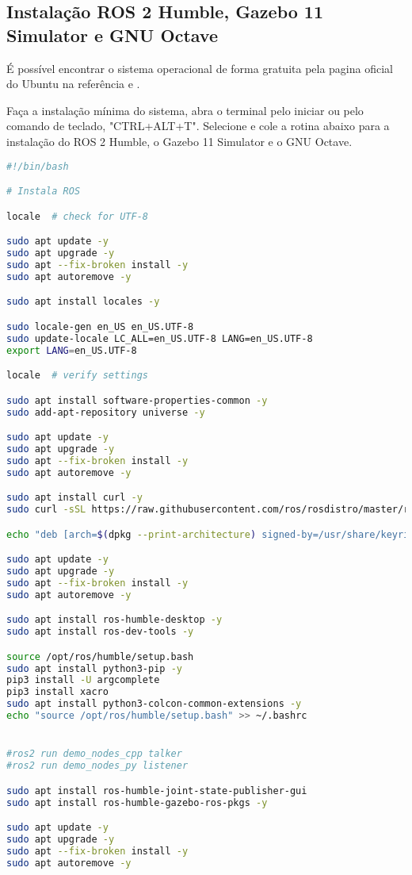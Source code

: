 \subsection{Instalação ROS 2 Humble, Gazebo 11 Simulator e GNU Octave}

É possível encontrar o sistema operacional de forma gratuita pela pagina oficial do Ubuntu na referência \cite{ubuntuweb} e \cite{gazebosim}.

Faça a instalação mínima do sistema, abra o terminal pelo iniciar ou pelo comando de teclado, "CTRL+ALT+T". Selecione e cole a rotina abaixo para a instalação do ROS 2 Humble, o Gazebo 11 Simulator e o GNU Octave.

\begin{lstlisting}[language=bash,caption={bash version}]
#!/bin/bash

# Instala ROS

locale  # check for UTF-8

sudo apt update -y
sudo apt upgrade -y
sudo apt --fix-broken install -y
sudo apt autoremove -y

sudo apt install locales -y

sudo locale-gen en_US en_US.UTF-8
sudo update-locale LC_ALL=en_US.UTF-8 LANG=en_US.UTF-8
export LANG=en_US.UTF-8

locale  # verify settings

sudo apt install software-properties-common -y
sudo add-apt-repository universe -y

sudo apt update -y
sudo apt upgrade -y
sudo apt --fix-broken install -y
sudo apt autoremove -y

sudo apt install curl -y
sudo curl -sSL https://raw.githubusercontent.com/ros/rosdistro/master/ros.key -o /usr/share/keyrings/ros-archive-keyring.gpg

echo "deb [arch=$(dpkg --print-architecture) signed-by=/usr/share/keyrings/ros-archive-keyring.gpg] http://packages.ros.org/ros2/ubuntu $(. /etc/os-release && echo $UBUNTU_CODENAME) main" | sudo tee /etc/apt/sources.list.d/ros2.list > /dev/null

sudo apt update -y
sudo apt upgrade -y
sudo apt --fix-broken install -y
sudo apt autoremove -y

sudo apt install ros-humble-desktop -y
sudo apt install ros-dev-tools -y

source /opt/ros/humble/setup.bash
sudo apt install python3-pip -y
pip3 install -U argcomplete
pip3 install xacro
sudo apt install python3-colcon-common-extensions -y
echo "source /opt/ros/humble/setup.bash" >> ~/.bashrc


#ros2 run demo_nodes_cpp talker
#ros2 run demo_nodes_py listener

sudo apt install ros-humble-joint-state-publisher-gui
sudo apt install ros-humble-gazebo-ros-pkgs -y

sudo apt update -y
sudo apt upgrade -y
sudo apt --fix-broken install -y
sudo apt autoremove -y
\end{lstlisting}

